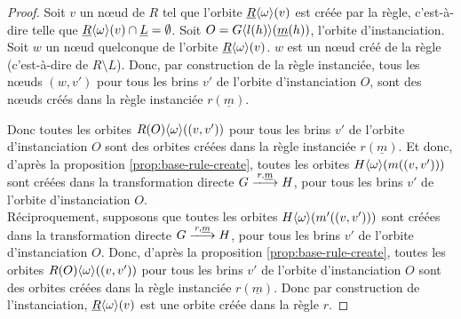 \begin{proof}
	Soit $v$ un n\oe ud de $R$ tel que l'orbite $\underline{R}\langle\omega\rangle(v)$ est créée
	par la règle, c'est-à-dire telle que
	$\underline{R}\langle\omega\rangle(v) \cap \underline{L} = \emptyset$. Soit
	$O = G\langle l(h)\rangle(\underline{m}(h))$, l'orbite d'instanciation. Soit $w$ un n\oe ud quelconque de l'orbite $\underline{R}\langle\omega\rangle(v)$. $w$ est un
	n\oe ud créé de la règle (c'est-à-dire de $R \setminus L$). %
	Donc, par construction de la règle instanciée,
	tous les n\oe uds $(w,v')$ pour tous les brins $v'$ de l'orbite d'instanciation
	$O$, sont des n\oe uds créés dans la règle instanciée $r(\underline{m})$.

	Donc toutes les orbites $R(O)\langle\omega\rangle((v,v'))$ pour tous les brins $v'$ de
	l'orbite d'instanciation $O$ sont des orbites créées dans la règle instanciée
	$r(\underline{m})$. Et donc, d'après la proposition \ref{prop:base-rule-create},
	toutes les orbites $H\langle\omega\rangle(m((v,v')))$ sont créées dans la transformation
	directe $G \xlongrightarrow{r, \underline{m}} H$, pour tous les brins $v'$ de l'orbite
	d'instanciation $O$.
	\\

	Réciproquement, supposons que toutes les orbites $H\langle\omega\rangle(m'((v,v')))$ sont créées dans la transformation directe $G \xlongrightarrow{r, \underline{m}} H$, pour tous les brins $v'$ de l'orbite d'instanciation $O$.
	Donc, d'après la proposition \ref{prop:base-rule-create}, toutes les orbites $R(O)\langle\omega\rangle((v,v'))$ pour tous les brins $v'$ de l'orbite d'instanciation $O$ sont des orbites créées dans la règle instanciée $r(\underline{m})$.
	Donc par construction de l'instanciation, $\underline{R}\langle\omega\rangle(v)$ est une orbite créée dans la règle $r$.
\end{proof}

